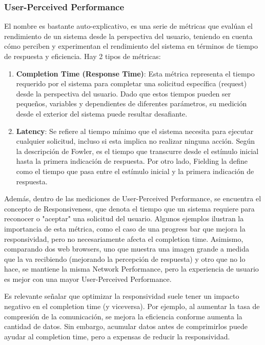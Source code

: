 \documentclass{article}
\begin{document}
 		\subsubsection{User-Perceived Performance}
 		El nombre es bastante auto-explicativo, es una serie de métricas que evalúan el rendimiento de un sistema desde la perspectiva del usuario, teniendo en cuenta cómo perciben y experimentan el rendimiento del sistema en términos de tiempo de respuesta y eficiencia.
 		Hay 2 tipos de métricas:
 		
 		
 		\begin{enumerate}
 			\item \textbf{Completion Time (Response Time)}: Esta métrica representa el tiempo requerido por el sistema para completar una solicitud específica (request) desde la perspectiva del usuario. Dado que estos tiempos pueden ser pequeños, variables y dependientes de diferentes parámetros, su medición desde el exterior del sistema puede resultar desafiante.
 			
 			\item \textbf{Latency}: Se refiere al tiempo mínimo que el sistema necesita para ejecutar cualquier solicitud, incluso si esta implica no realizar ninguna acción. Según la descripción de Fowler, es el tiempo que transcurre desde el estímulo inicial hasta la primera indicación de respuesta. Por otro lado, Fielding la define como el tiempo que pasa entre el estímulo inicial y la primera indicación de respuesta.
 			
 		\end{enumerate}
 		
 		Además, dentro de las mediciones de User-Perceived Performance, se encuentra el concepto de Responsiveness, que denota el tiempo que un sistema requiere para reconocer o "aceptar" una solicitud del usuario. Algunos ejemplos ilustran la importancia de esta métrica, como el caso de una progress bar que mejora la responsividad, pero no necesariamente afecta el completion time. Asimismo, comparando dos web browsers, uno que muestra una imagen grande a medida que la va recibiendo (mejorando la percepción de respuesta) y otro que no lo hace, se mantiene la misma Network Performance, pero la experiencia de usuario es mejor con una mayor User-Perceived Performance.
 		
 		Es relevante señalar que optimizar la responsividad suele tener un impacto negativo en el completion time (y viceversa). Por ejemplo, al aumentar la tasa de compresión de la comunicación, se mejora la eficiencia conforme aumenta la cantidad de datos. Sin embargo, acumular datos antes de comprimirlos puede ayudar al completion time, pero a expensas de reducir la responsividad.
 		
\end{document}
